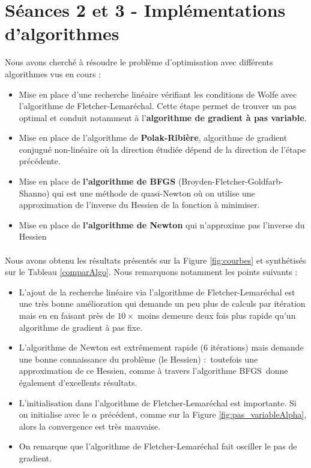 \documentclass{article}
\begin{document}
\section{Séances 2 et 3 - Implémentations d'algorithmes}

    Nous avons cherché à résoudre le problème d'optimisation avec différents algorithmes vus en cours :
    \begin{itemize}
        \item Mise en place d'une recherche linéaire vérifiant les conditions de Wolfe avec l'algorithme de Fletcher-Lemaréchal. Cette étape permet de trouver un pas optimal et conduit notamment à l'\textbf{algorithme de gradient à pas variable}.
        \item Mise en place de l'algorithme de \textbf{Polak-Ribière}, algorithme de gradient conjugué non-linéaire où la direction étudiée dépend de la direction de l'étape précédente.
        \item Mise en place de \textbf{l'algorithme de BFGS} (Broyden-Fletcher-Goldfarb-Shanno) qui est une méthode de quasi-Newton où on utilise une approximation de l'inverse du Hessien de la fonction à minimiser.
        \item Mise en place de \textbf{l'algorithme de Newton} qui n'approxime pas l'inverse du Hessien
    \end{itemize}

    \paragraph{}Nous avons obtenu les résultats présentés sur la Figure \ref{fig:courbes} et synthétisés sur le Tableau \ref{comparAlgo}. Nous remarquons notamment les points suivants :
    \begin{itemize}
        \item L'ajout de la recherche linéaire via l'algorithme de Fletcher-Lemaréchal est une très bonne amélioration qui demande un peu plus de calculs par itération mais en en faisant près de $10\times$ moins demeure deux fois plus rapide qu'un algorithme de gradient à pas fixe.
        \item L'algorithme de Newton est extrêmement rapide (6 itérations) mais demande une bonne connaissance du problème (le Hessien) : toutefois une approximation de ce Hessien, comme à travers l'algorithme BFGS donne également d'excellents résultats.
        \item L'initialisation dans l'algorithme de Fletcher-Lemaréchal est importante. Si on initialise avec le $\alpha$ précédent, comme sur la Figure \ref{fig:pas_variableAlpha}, alors la convergence est très mauvaise.
        \item On remarque que l'algorithme de Fletcher-Lemaréchal fait osciller le pas de gradient.
    \end{itemize}
\end{document}
